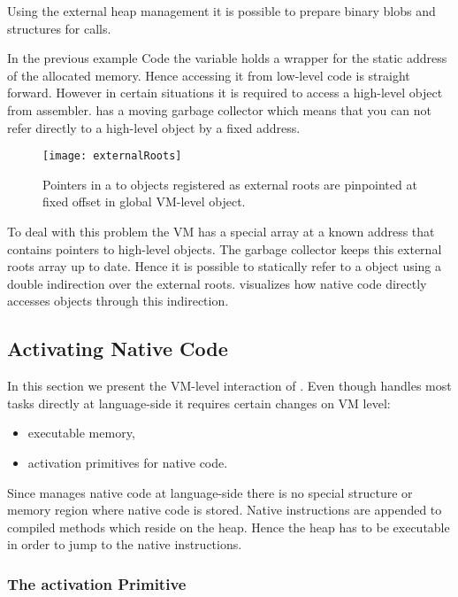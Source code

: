 Using the external heap management it is possible to prepare binary blobs and structures for \FFI calls.

In the previous example Code  the  variable holds a wrapper for the static address of the allocated memory.
Hence accessing it from low-level code is straight forward.
However in certain situations it is required to access a high-level object from assembler.
\PH has a moving garbage collector which means that you can not refer directly to a high-level object by a fixed address.

\begin{figure}[h]
	\centering
	\texttt{[image: externalRoots]}
	\caption[\NBFFI External Roots]{Pointers in a  to objects registered as external roots are pinpointed at fixed offset in global VM-level object.}
\end{figure}

To deal with this problem the VM has a special array at a known address that contains pointers to high-level objects.
The garbage collector keeps this external roots array up to date.
Hence it is possible to statically refer to a \PH object using a double indirection over the external roots.
 visualizes how native code directly accesses \PH objects through this indirection.


\subsection{Activating Native Code}

In this section we present the VM-level interaction of \NB.
Even though \NB handles most tasks directly at language-side it requires certain changes on VM level:
\begin{itemize}
	\item executable memory,
	\item activation primitives for native code.
\end{itemize}
%
Since \NB manages native code at language-side there is no special structure or memory region where native code is stored.
Native instructions are appended to compiled methods which reside on the heap.
Hence the heap has to be executable in order to jump to the native instructions.


\subsubsection{The \NB activation Primitive}

